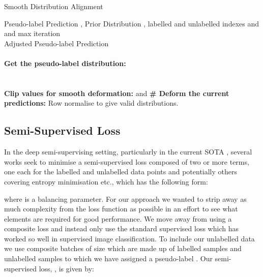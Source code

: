 \documentclass[journal]{IEEEtran}
\begin{document}
\begin{algorithm}[t!]
\caption{Smooth Distribution Alignment}
\label{alg:da}
\begin{algorithmic}[1]
     Pseudo-label Prediction , Prior Distribution , labelled and unlabelled indexes  and  and max iteration   \\
     Adjusted Pseudo-label Prediction   \\
    \STATE  \\
    \textbf{\textcolor{greenPython}{Get the pseudo-label distribution:}}\\
    \FOR{}
        \STATE  \\  
    \ENDFOR 
    \STATE  \\
    \textbf{\textcolor{greenPython}{ Clip values for smooth deformation:}}
    \STATE  and 
    \textbf{\textcolor{greenPython}{\# Deform the current predictions:}}
        \STATE  
    \ENDFOR
    \STATE Row normalise  to give valid distributions. \\
    \ENDFOR
\end{algorithmic}
\end{algorithm}


\subsection{Semi-Supervised Loss}

In the deep semi-supervising setting, particularly in the current SOTA \cite{sohn2020fixmatch} \cite{berthelot2019mixmatch}, several works seek to minimise a semi-supervised loss  composed of two or more terms, one each for the labelled and unlabelled data points and potentially others covering entropy minimisation etc., which has the following form:


\noindent
where  is a balancing parameter. For our approach we wanted to strip away as much complexity from the loss function as possible in an effort to see what elements are required for good performance.  We move away from using a  composite loss and instead only use the standard supervised loss which has worked so well in supervised image classification. To include our unlabelled data we use composite batches of size  which are made up of  labelled samples and  unlabelled samples to which we have assigned a pseudo-label . Our semi-supervised loss, , is given by:
\end{document}
